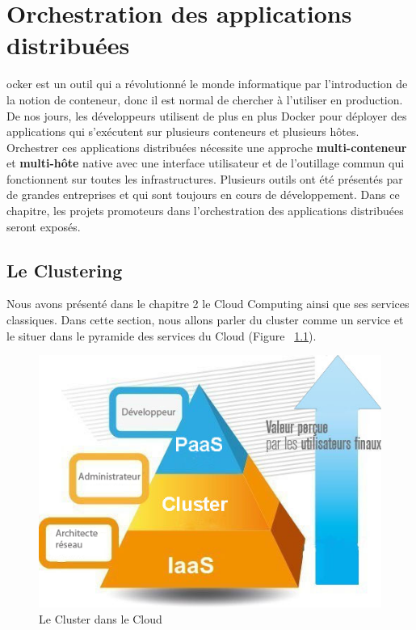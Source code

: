 \chapter{Orchestration des applications distribuées}
\begin{onehalfspace}

ocker est un outil qui a révolutionné le monde informatique par l'introduction de la notion de conteneur, donc il est normal de chercher à l'utiliser en production. De nos jours, les développeurs utilisent de plus en plus Docker pour déployer des applications qui s'exécutent sur plusieurs conteneurs et plusieurs hôtes. Orchestrer ces applications distribuées nécessite une approche \textbf{multi-conteneur} et \textbf{multi-hôte} native avec une interface utilisateur et de l'outillage commun qui fonctionnent sur toutes les infrastructures. Plusieurs outils ont été présentés par de grandes entreprises et qui sont toujours en cours de développement. Dans ce chapitre, les projets promoteurs dans l'orchestration des applications distribuées seront exposés.

\newpage

\section{Le Clustering}


Nous avons présenté dans le chapitre 2 le Cloud Computing ainsi que ses services classiques. Dans cette section, nous allons parler du cluster comme un service et le situer dans le pyramide des services du Cloud (Figure ~\ref{fig:pyramide-cluster}).

\begin{figure}[H]
\centering
\includegraphics [scale=0.7]{chapitre3/assets/pyramide}
\caption{Le Cluster dans le Cloud}
\label{fig:pyramide-cluster}
\end{figure}


\end{onehalfspace}
